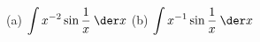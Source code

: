 (a)
 $\displaystyle \int x^{-2}\sin\frac{1}{x}\:\der x$
 \qquad
 (b)
 $\displaystyle \int x^{-1}\sin\frac{1}{x}\:\der x$
\answercheck
